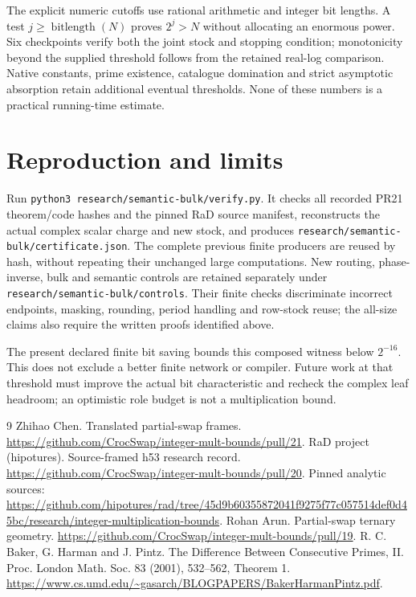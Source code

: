 \documentclass[11pt]{article}
\begin{document}
The explicit numeric cutoffs use rational arithmetic and integer bit
lengths. A test $j\ge\operatorname{bitlength}(N)$ proves $2^j>N$
without allocating an enormous power. Six checkpoints verify both the
joint stock and stopping condition; monotonicity beyond the supplied
threshold follows from the retained real-log comparison. Native
constants, prime existence, catalogue domination and strict asymptotic
absorption retain additional eventual thresholds. None of these numbers
is a practical running-time estimate.

\section{Reproduction and limits}
Run \texttt{python3 research/semantic-bulk/verify.py}. It checks all
recorded PR21 theorem/code hashes and the pinned RaD source manifest,
reconstructs the actual complex scalar charge and new stock, and produces
\texttt{research/semantic-bulk/certificate.json}. The complete previous
finite producers are reused by hash, without repeating their unchanged
large computations. New routing, phase-inverse, bulk and semantic controls
are retained separately under \texttt{research/semantic-bulk/controls}.
Their finite checks discriminate incorrect endpoints, masking, rounding,
period handling and row-stock reuse; the all-size claims also require
the written proofs identified above.

The present declared finite bit saving bounds this composed witness below
$2^{-16}$. This does not exclude a better finite network or compiler.
Future work at that threshold must improve the actual bit characteristic
and recheck the complex leaf headroom; an optimistic role budget is not
a multiplication bound.

\begin{thebibliography}{9}
 Zhihao Chen. Translated partial-swap frames.
\url{https://github.com/CrocSwap/integer-mult-bounds/pull/21}.
 RaD project (hipotures). Source-framed h53 research record.
\url{https://github.com/CrocSwap/integer-mult-bounds/pull/20}.
Pinned analytic sources: \url{https://github.com/hipotures/rad/tree/45d9b60355872041f9275f77c057514def0d45bc/research/integer-multiplication-bounds}.
 Rohan Arun. Partial-swap ternary geometry.
\url{https://github.com/CrocSwap/integer-mult-bounds/pull/19}.
 R. C. Baker, G. Harman and J. Pintz.
The Difference Between Consecutive Primes, II.
Proc. London Math. Soc. 83 (2001), 532--562, Theorem 1.
\url{https://www.cs.umd.edu/~gasarch/BLOGPAPERS/BakerHarmanPintz.pdf}.
\end{thebibliography}
\end{document}
